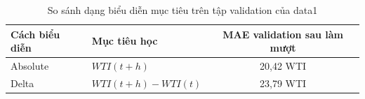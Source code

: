 \begin{table}[htbp]
        \centering
        \caption{So sánh dạng biểu diễn mục tiêu trên tập validation của data1}
        \begin{tabular}{|l|l|c|}
            \hline
            \textbf{Cách biểu diễn} & \textbf{Mục tiêu học} & \textbf{MAE validation sau làm mượt} \\
            \hline
            Absolute & $WTI(t+h)$ & 20,42 WTI \\
            Delta & $WTI(t+h) - WTI(t)$ & 23,79 WTI \\
            \hline
        \end{tabular}
    \end{table}